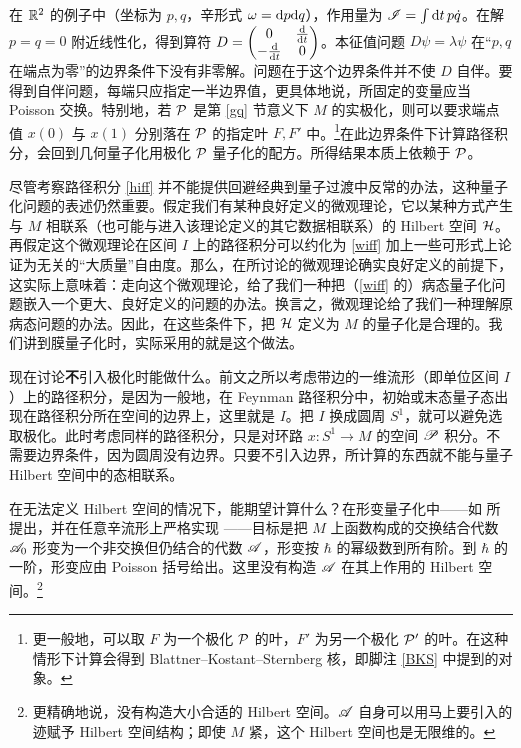 在 $\R^2$ 的例子中（坐标为 $p,q$，辛形式 $\omega=\d p\d q$），作用量为 $\sI=\int \d t\, p \dot q$。在解 $p=q=0$ 附近线性化，得到算符 $D=\begin{pmatrix} 0 & \frac{\d}{\d t}\cr -\frac{\d}{\d t}& 0\end{pmatrix}$。本征值问题 $D\psi=\lambda\psi$ 在“$p,q$ 在端点为零”的边界条件下没有非零解。问题在于这个边界条件并不使 $D$ 自伴。要得到自伴问题，每端只应指定一半边界值，更具体地说，所固定的变量应当 Poisson 交换。特别地，若 $\P$ 是第 \ref{gq} 节意义下 $M$ 的实极化，则可以要求端点值 $x(0)$ 与 $x(1)$ 分别落在 $\P$ 的指定叶 $F,F'$ 中。\footnote{\label{BKStwo}更一般地，可以取 $F$ 为一个极化 $\P$ 的叶，$F'$ 为另一个极化 $\P'$ 的叶。在这种情形下计算会得到 Blattner--Kostant--Sternberg 核，即脚注 \ref{BKS} 中提到的对象。}在此边界条件下计算路径积分，会回到几何量子化用极化 $\P$ 量子化的配方。所得结果本质上依赖于 $\P$。

尽管考察路径积分 \eqref{hiff} 并不能提供回避经典到量子过渡中反常的办法，这种量子化问题的表述仍然重要。假定我们有某种良好定义的微观理论，它以某种方式产生与 $M$ 相联系（也可能与进入该理论定义的其它数据相联系）的 Hilbert 空间 $\H$。再假定这个微观理论在区间 $I$ 上的路径积分可以约化为 \eqref{wiff} 加上一些可形式上论证为无关的“大质量”自由度。那么，在所讨论的微观理论确实良好定义的前提下，这实际上意味着：走向这个微观理论，给了我们一种把（\eqref{wiff} 的）病态量子化问题嵌入一个更大、良好定义的问题的办法。换言之，微观理论给了我们一种理解原病态问题的办法。因此，在这些条件下，把 $\H$ 定义为 $M$ 的量子化是合理的。我们讲到膜量子化时，实际采用的就是这个做法。

现在讨论\textbf{不}引入极化时能做什么。前文之所以考虑带边的一维流形（即单位区间 $I$）上的路径积分，是因为一般地，在 Feynman 路径积分中，初始或末态量子态出现在路径积分所在空间的边界上，这里就是 $I$。把 $I$ 换成圆周 $S^1$，就可以避免选取极化。此时考虑同样的路径积分，只是对环路 $x:S^1\to M$ 的空间 $\pP$ 积分。不需要边界条件，因为圆周没有边界。只要不引入边界，所计算的东西就不能与量子 Hilbert 空间中的态相联系。

在无法定义 Hilbert 空间的情况下，能期望计算什么？在形变量子化中——如 \cite{Many} 所提出，并在任意辛流形上严格实现 \cite{WL,Fedosov}——目标是把 $M$ 上函数构成的交换结合代数 $\A_0$ 形变为一个非交换但仍结合的代数 $\A$，形变按 $\hbar$ 的幂级数到所有阶。到 $\hbar$ 的一阶，形变应由 Poisson 括号给出。这里没有构造 $\A$ 在其上作用的 Hilbert 空间。\footnote{更精确地说，没有构造大小合适的 Hilbert 空间。$\A$ 自身可以用马上要引入的迹赋予 Hilbert 空间结构；即使 $M$ 紧，这个 Hilbert 空间也是无限维的。}


